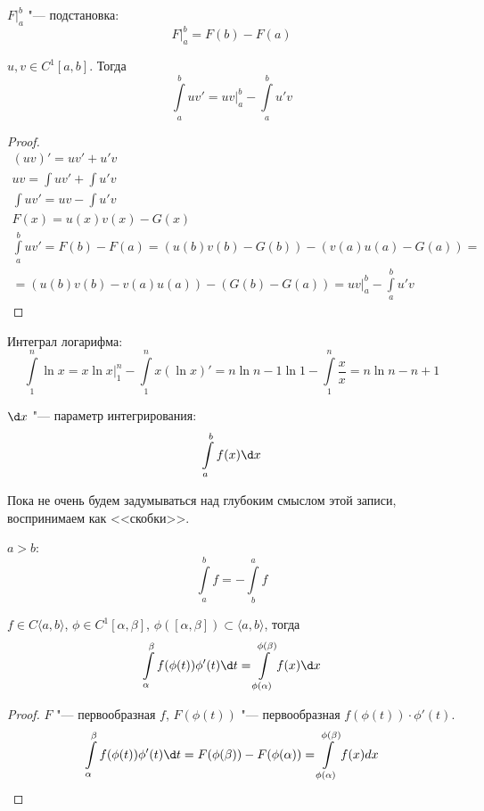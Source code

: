 \begin{Def}
	$ F \bigl|_{a}^{b}$ "--- подстановка:
	\[ F \bigl|_{a}^{b} = F(b) - F(a) \]
\end{Def}

\begin{theorem}
	$u, v \in C^1[a, b]$.
	Тогда
	\[ \int\limits_a^b u v' = uv \biggl|_a^b - \int\limits_a^b u' v \]
\end{theorem}

\begin{proof}
	\begin{gather*}
		(uv)' = u v' + u' v\\
		uv = \int u v' + \int u' v\\
		\int u v' = uv - \int u' v\\
		F(x) = u(x)v(x) - G(x) \\
		\int\limits_a^b u v' = F(b) - F(a) = (u(b)v(b) - G(b)) - (v(a)u(a) - G(a)) = \\
		= (u(b)v(b) - v(a)u(a)) - (G(b) - G(a)) = uv |_{a}^{b} - \int\limits_a^b u' v
	\end{gather*}
\end{proof}

\begin{exmp}
	Интеграл логарифма:
	\[ \int\limits_1^n \ln x = x \ln x \biggl|_{1}^{n} - \int\limits_1^n x (\ln x)' = n \ln n - 1 \ln 1 - \int\limits_1^n \frac{x}{x} = n \ln n - n + 1 \]
\end{exmp}

\begin{Def}
	$\d x$ "--- параметр интегрирования:
	\[ \int\limits_a^b f(x) \d x \]
\end{Def}
Пока не очень будем задумываться над глубоким смыслом этой записи, воспринимаем как <<скобки>>.

\begin{Def}
	$a > b$:
	\[ \int\limits_a^b f = - \int\limits_b^a f \]
\end{Def}

\begin{theorem}
	$f \in C\langle a, b \rangle$,  $\phi \in C^1[ \alpha, \beta]$, $\phi([\alpha, \beta]) \subset \langle a, b \rangle$, тогда
	\[ \int\limits_{\alpha}^{\beta} f(\phi(t)) \phi'(t) \d t = \int\limits_{\phi(\alpha)}^{\phi(\beta)} f(x) \d x\]
\end{theorem}
\begin{proof}
	$F$ "--- первообразная $f$, $F(\phi(t))$ "--- первообразная $f(\phi (t)) \cdot \phi'(t)$.
	\[ \int\limits_{\alpha}^{\beta} f(\phi (t)) \phi'(t) \d t = F(\phi (\beta)) - F(\phi (\alpha)) = \int\limits_{\phi(\alpha)}^{\phi(\beta)} f(x) dx \]
\end{proof}
